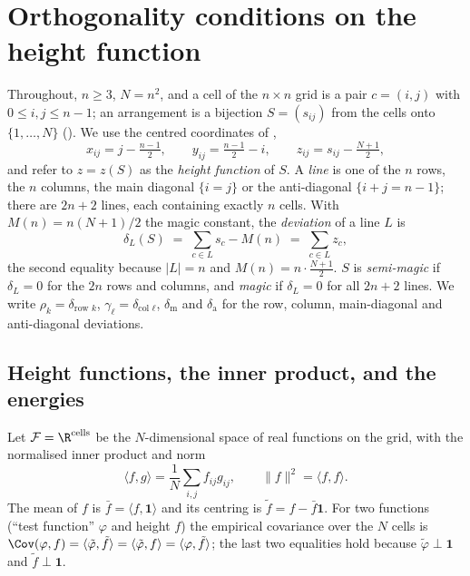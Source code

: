 
\section{Orthogonality conditions on the height function}
\label{sec:theory}

Throughout, $n\ge 3$, $N=n^{2}$, and a cell of the $n\times n$ grid is a pair
$c=(i,j)$ with $0\le i,j\le n-1$; an arrangement is a bijection $S=(s_{ij})$ from the cells onto
$\{1,\dots,N\}$ ().  We use the centred
coordinates of ,
\[
x_{ij}=j-\tfrac{n-1}{2},\qquad y_{ij}=\tfrac{n-1}{2}-i,\qquad
z_{ij}=s_{ij}-\tfrac{N+1}{2},
\]
and refer to $z=z(S)$ as the \emph{height function} of $S$.
A \emph{line} is one of the $n$ rows, the $n$ columns, the main diagonal
$\{i=j\}$ or the anti-diagonal $\{i+j=n-1\}$; there are $2n+2$ lines, each
containing exactly $n$ cells.  With $M(n)=n(N+1)/2$ the magic constant, the
\emph{deviation} of a line $L$ is
\begin{equation}
\delta_L(S)\;=\;\sum_{c\in L}s_c-M(n)\;=\;\sum_{c\in L}z_c ,
\label{eq:line_dev}
\end{equation}
the second equality because $|L|=n$ and $M(n)=n\cdot\frac{N+1}{2}$.
$S$ is \emph{semi-magic} if $\delta_L=0$ for the $2n$ rows and columns, and
\emph{magic} if $\delta_L=0$ for all $2n+2$ lines.  We write $\rho_k=\delta_{\text{row }k}$,
$\gamma_\ell=\delta_{\text{col }\ell}$, $\delta_{\mathrm{m}}$ and $\delta_{\mathrm{a}}$ for the
row, column, main-diagonal and anti-diagonal deviations.

\subsection{Height functions, the inner product, and the energies}
\label{sec:theory_setup}

Let $\mathcal F=\R^{\text{cells}}$ be the $N$-dimensional space of real
functions on the grid, with the normalised inner product and norm
\begin{equation}
\langle f,g\rangle=\frac1N\sum_{i,j}f_{ij}g_{ij},\qquad \|f\|^{2}=\langle f,f\rangle .
\label{eq:inner}
\end{equation}
The mean of $f$ is $\bar f=\langle f,\mathbf 1\rangle$ and its centring is
$\tilde f=f-\bar f\mathbf 1$.  For two functions (``test function'' $\varphi$ and
height $f$) the empirical covariance over the $N$ cells is
$\Cov(\varphi,f)=\langle\tilde\varphi,\tilde f\rangle=\langle\tilde\varphi,f\rangle=\langle\varphi,\tilde f\rangle$;
the last two equalities hold because $\tilde\varphi\perp\mathbf 1$ and $\tilde f\perp\mathbf 1$.

